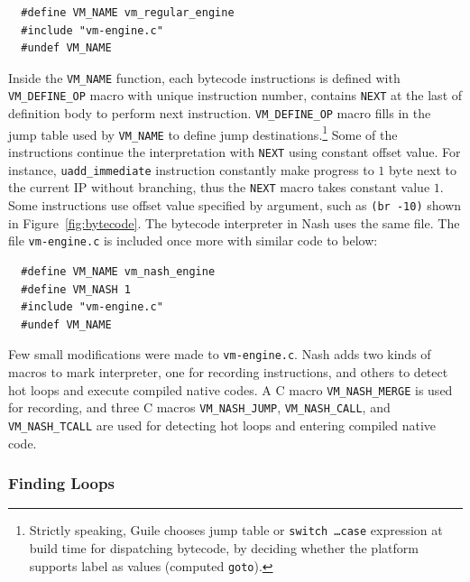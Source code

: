 \documentclass[preprint, 10pt]{sigplanconf}
\begin{document}
\begin{verbatim}
  #define VM_NAME vm_regular_engine
  #include "vm-engine.c"
  #undef VM_NAME
\end{verbatim}

Inside the \texttt{VM\_NAME} function, each bytecode instructions is defined
with \texttt{VM\_DEFINE\_OP} macro with unique instruction number, contains
\texttt{NEXT} at the last of definition body to perform next
instruction. \texttt{VM\_DEFINE\_OP} macro fills in the jump table used by
\texttt{VM\_NAME} to define jump destinations.\footnote{Strictly speaking,
  Guile chooses jump table or \texttt{switch \ldots\@ case} expression at
  build time for dispatching bytecode, by deciding whether the platform
  supports label as values (computed \texttt{goto}).}  Some of the
instructions continue the interpretation with \texttt{NEXT} using constant
offset value. For instance, \texttt{uadd\_immediate} instruction constantly
make progress to $1$ byte next to the current IP without branching, thus the
\texttt{NEXT} macro takes constant value $1$. Some instructions use offset
value specified by argument, such as \texttt{(br -10)} shown in
Figure~\hyperref[fig:bytecode]{\ref{fig:bytecode}}.  The bytecode interpreter
in Nash uses the same file.  The file \texttt{vm-engine.c} is included once
more with similar code to below:

\begin{verbatim}
  #define VM_NAME vm_nash_engine
  #define VM_NASH 1
  #include "vm-engine.c"
  #undef VM_NAME
\end{verbatim}

Few small modifications were made to \texttt{vm-engine.c}. Nash adds two kinds
of macros to mark interpreter, one for recording instructions, and others to
detect hot loops and execute compiled native codes. A C macro
\texttt{VM\_NASH\_MERGE} is used for recording, and three C macros
\texttt{VM\_NASH\_JUMP}, \texttt{VM\_NASH\_CALL}, and \texttt{VM\_NASH\_TCALL}
are used for detecting hot loops and entering compiled native code.

\subsubsection{Finding Loops}
\end{document}
